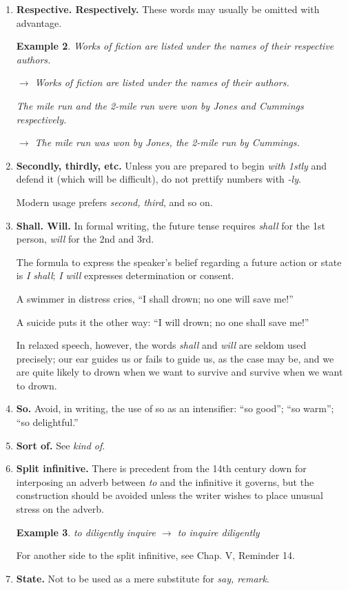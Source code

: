 \documentclass{article}
\newtheorem{example}{Example}
\begin{document}
\begin{enumerate}
\begin{example}
		$\to$ Janet and I see things the same way./Janet and I have a lot in common.
	\end{example}
	\item {\bf Respective. Respectively.} These words may usually be omitted with advantage.
	\begin{example}
		Works of fiction are listed under the names of their respective authors.
		
		$\to$ Works of fiction are listed under the names of their authors.
		
		The mile run and the 2-mile run were won by Jones and Cummings respectively.
		
		$\to$ The mile run was won by Jones, the 2-mile run by Cummings.
	\end{example}
	\item {\bf Secondly, thirdly, etc.} Unless you are prepared to begin {\it with 1stly} and defend it (which will be difficult), do not prettify numbers with {\it -ly}.
	
	Modern usage prefers {\it second, third}, and so on.
	\item {\bf Shall. Will.} In formal writing, the future tense requires {\it shall} for the 1st person, {\it will} for the 2nd and 3rd.
	
	The formula to express the speaker's belief regarding a future action or state is {\it I shall}; {\it I will} expresses determination or consent.
	
	A swimmer in distress cries, ``I shall drown; no one will save me!''
	
	A suicide puts it the other way: ``I will drown; no one shall save me!''
	
	In relaxed speech, however, the words {\it shall} and {\it will} are seldom used precisely; our ear guides us or fails to guide us, as the case may be, and we are quite likely to drown when we want to survive and survive when we want to drown.
	\item {\bf So.} Avoid, in writing, the use of so as an intensifier: ``so good''; ``so warm''; ``so delightful.''
	\item {\bf Sort of.} See {\it kind of}.
	\item {\bf Split infinitive.} There is precedent from the 14th century down for interposing an adverb between {\it to} and the infinitive it governs, but the construction should be avoided unless the writer wishes to place unusual stress on the adverb.
	\begin{example}
		to diligently inquire $\to$ to inquire diligently
	\end{example}
	For another side to the split infinitive, see Chap. V, Reminder 14.
	\item {\bf State.} Not to be used as a mere substitute for {\it say, remark}.
	

\end{enumerate}
\end{document}
